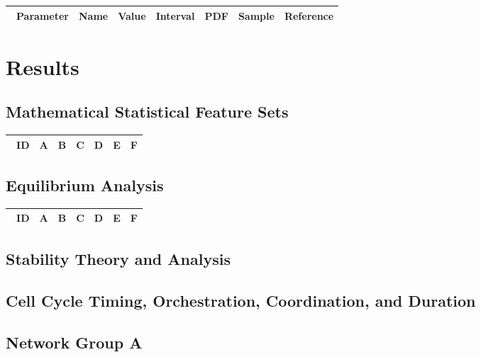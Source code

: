 \documentclass[preprint, 8pt]{elsarticle}
\theoremstyle{definition}
\begin{document}
\begin{table}[H]\centering
\begin{tabular}{p{1cm}p{1cm}p{1cm}p{1cm}p{1cm}p{1cm}p{4cm}}\
Parameter & Name & Value & Interval & PDF & Sample & Reference \\
\hline
\hline
\end{tabular}
\end{table}

\section{Results}

\subsection{Mathematical Statistical Feature Sets}

\begin{table}[H]\centering
\begin{tabular}{p{1cm}p{1cm}p{1cm}p{1cm}p{1cm}p{1cm}p{4cm}}\
ID & A & B & C & D & E & F \\
\hline
\hline
\end{tabular}
\end{table}

\subsection{Equilibrium Analysis}

\begin{table}[H]\centering
\begin{tabular}{p{1cm}p{1cm}p{1cm}p{1cm}p{1cm}p{1cm}p{4cm}}\
ID & A & B & C & D & E & F \\
\hline
\hline
\end{tabular}
\end{table}

\subsection{Stability Theory and Analysis}

\subsection{Cell Cycle Timing, Orchestration, Coordination, and Duration}

\subsection{Network Group A}
\end{document}
